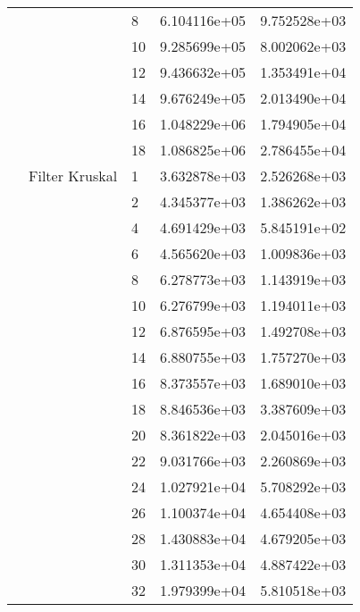 \begin{tabular}{lllrr}
                      &            & 8  &  6.104116e+05 &  9.752528e+03 \\
                      &            & 10 &  9.285699e+05 &  8.002062e+03 \\
                      &            & 12 &  9.436632e+05 &  1.353491e+04 \\
                      &            & 14 &  9.676249e+05 &  2.013490e+04 \\
                      &            & 16 &  1.048229e+06 &  1.794905e+04 \\
                      &            & 18 &  1.086825e+06 &  2.786455e+04 \\
                      & Filter Kruskal & 1  &  3.632878e+03 &  2.526268e+03 \\
                      &            & 2  &  4.345377e+03 &  1.386262e+03 \\
                      &            & 4  &  4.691429e+03 &  5.845191e+02 \\
                      &            & 6  &  4.565620e+03 &  1.009836e+03 \\
                      &            & 8  &  6.278773e+03 &  1.143919e+03 \\
                      &            & 10 &  6.276799e+03 &  1.194011e+03 \\
                      &            & 12 &  6.876595e+03 &  1.492708e+03 \\
                      &            & 14 &  6.880755e+03 &  1.757270e+03 \\
                      &            & 16 &  8.373557e+03 &  1.689010e+03 \\
                      &            & 18 &  8.846536e+03 &  3.387609e+03 \\
                      &            & 20 &  8.361822e+03 &  2.045016e+03 \\
                      &            & 22 &  9.031766e+03 &  2.260869e+03 \\
                      &            & 24 &  1.027921e+04 &  5.708292e+03 \\
                      &            & 26 &  1.100374e+04 &  4.654408e+03 \\
                      &            & 28 &  1.430883e+04 &  4.679205e+03 \\
                      &            & 30 &  1.311353e+04 &  4.887422e+03 \\
                      &            & 32 &  1.979399e+04 &  5.810518e+03 \\

\end{tabular}
